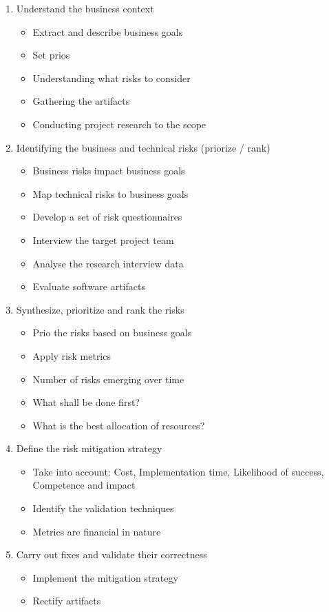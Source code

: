 \begin{enumerate}
    \item Understand the business context
    \begin{itemize}
        \item Extract and describe business goals
        \item Set prios
        \item Understanding what risks to consider
        \item Gathering the artifacts
        \item Conducting project research to the scope
    \end{itemize}
    \item Identifying the business and technical risks (priorize / rank)
    \begin{itemize}
        \item Business risks impact business goals
        \item Map technical risks to business goals
        \item Develop a set of risk questionnaires
        \item Interview the target project team
        \item Analyse the research interview data
        \item Evaluate software artifacts
    \end{itemize}
    \item Synthesize, prioritize and rank the risks
    \begin{itemize}
        \item Prio the risks based on business goals
        \item Apply risk metrics
        \item Number of risks emerging over time
        \item What shall be done first?
        \item What is the best allocation of resources?
    \end{itemize}
    \item Define the risk mitigation strategy
    \begin{itemize}
        \item Take into account: Cost, Implementation time, Likelihood of success, Competence and impact
        \item Identify the validation techniques
        \item Metrics are financial in nature
    \end{itemize}
    \item Carry out fixes and validate their correctness
    \begin{itemize}
        \item Implement the mitigation strategy
        \item Rectify artifacts
    \end{itemize}
\end{enumerate}


